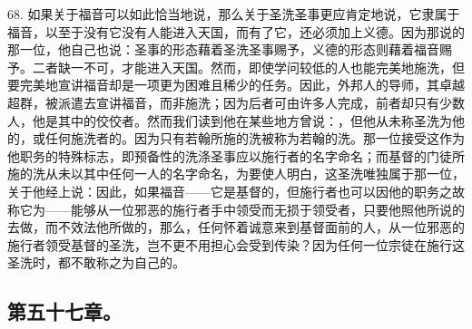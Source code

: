 68. 如果关于福音可以如此恰当地说，那么关于圣洗圣事更应肯定地说，它隶属于福音，以至于没有它没有人能进入天国，而有了它，还必须加上义德。因为那说的那一位，他自己也说：圣事的形态藉着圣洗圣事赐予，义德的形态则藉着福音赐予。二者缺一不可，才能进入天国。然而，即使学问较低的人也能完美地施洗，但要完美地宣讲福音却是一项更为困难且稀少的任务。因此，外邦人的导师，其卓越超群，被派遣去宣讲福音，而非施洗；因为后者可由许多人完成，前者却只有少数人，他是其中的佼佼者。然而我们读到他在某些地方曾说：，但他从未称圣洗为他的，或任何施洗者的。因为只有若翰所施的洗被称为若翰的洗。那一位接受这作为他职务的特殊标志，即预备性的洗涤圣事应以施行者的名字命名；而基督的门徒所施的洗从未以其中任何一人的名字命名，为要使人明白，这圣洗唯独属于那一位，关于他经上说：因此，如果福音——它是基督的，但施行者也可以因他的职务之故称它为——能够从一位邪恶的施行者手中领受而无损于领受者，只要他照他所说的去做，而不效法他所做的，那么，任何怀着诚意来到基督面前的人，从一位邪恶的施行者领受基督的圣洗，岂不更不用担心会受到传染？因为任何一位宗徒在施行这圣洗时，都不敢称之为自己的。\par


\subsection{第五十七章。}

